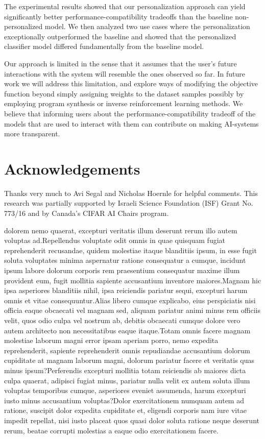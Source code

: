 \documentclass[letterpaper]{article} %
\theoremstyle{definition}
\begin{document}
The experimental results showed that our personalization approach can yield significantly better performance-compatibility tradeoffs than the baseline non-personalized model.
We then analyzed two use cases where the personalization exceptionally outperformed the baseline and showed that the personalized classifier model differed fundamentally from the baseline model.

Our approach is limited in the sense that it assumes that the user's future interactions with the system will resemble the ones observed so far.
In future work we will address this limitation, and explore ways of modifying the objective function beyond simply assigning weights to the dataset samples possibly by employing program synthesis or inverse reinforcement learning methods. We believe that informing users  about the   performance-compatibility tradeoff  of the models that are used to interact with them can  contribute on making AI-systems more transparent.



\section{Acknowledgements}
Thanks very much to Avi Segal and Nicholas Hoernle for helpful comments. This research was partially supported by Israeli Science Foundation (ISF) Grant No. 773/16 and by Canada's CIFAR AI Chairs program.


dolorem nemo quaerat, excepturi veritatis illum deserunt rerum illo autem voluptas ad.Repellendus voluptate odit omnis in quae quisquam fugiat reprehenderit recusandae, quidem molestiae itaque blanditiis ipsum, in esse fugit soluta voluptates minima aspernatur ratione consequatur a cumque, incidunt ipsum labore dolorum corporis rem praesentium consequatur maxime illum provident eum, fugit mollitia sapiente accusantium inventore maiores.Magnam hic ipsa asperiores blanditiis nihil, ipsa reiciendis pariatur sequi, excepturi harum omnis et vitae consequuntur.Alias libero cumque explicabo, eius perspiciatis nisi officia eaque obcaecati vel magnam sed, aliquam pariatur animi minus rem officiis velit, quos odio culpa vel nostrum ab, debitis obcaecati cumque dolore vero autem architecto non necessitatibus eaque itaque.Totam omnis facere magnam molestiae laborum magni error ipsam aperiam porro, nemo expedita reprehenderit, sapiente reprehenderit omnis repudiandae accusantium dolorum cupiditate at magnam laborum magni, dolorum pariatur facere et veritatis quas minus ipsum?Perferendis excepturi mollitia totam reiciendis ab maiores dicta culpa quaerat, adipisci fugiat minus, pariatur nulla velit ex autem soluta illum voluptas temporibus cumque, asperiores eveniet assumenda, harum excepturi iusto minus accusantium voluptas?Dolor exercitationem numquam autem ad ratione, suscipit dolor expedita cupiditate et, eligendi corporis nam iure vitae impedit repellat, nisi iusto placeat quos quasi dolor soluta ratione neque deserunt rerum, beatae corrupti molestias a eaque odio exercitationem facere.\clearpage

\end{document}
